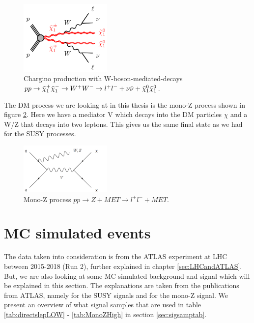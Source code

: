 \begin{figure}[H]
    \centering
    \includegraphics[width = 0.4\textwidth]{Figures/FeynmanDiagrams/WWFeynman.png}
    \caption{Chargino production with W-boson-mediated-decays $pp \rightarrow \tilde{\chi}_1^+ \tilde{\chi}_1^- \rightarrow W^+ W^- \rightarrow l^+l^- + \nu \Bar{\nu} + \tilde{\chi}_1^0 \tilde{\chi}_1^0$.}
    \label{fig:WWFeynman}
\end{figure}

The DM process we are looking at in this thesis is the mono-Z process shown in figure \ref{fig:monoZFeynman2}. Here we have a mediator V which decays into the DM particles $\chi$ and a W/Z that decays into two leptons. This gives us the same final state as we had for the SUSY processes.  

\begin{figure}[H]
    \centering
    \includegraphics[width = 0.4\textwidth]{Figures/FeynmanDiagrams/monoZFeynman2.png}
    \caption{Mono-Z process $pp \rightarrow Z + MET \rightarrow l^+ l^- + MET$.}
    \label{fig:monoZFeynman2}
\end{figure}


\section{MC simulated events}

The data taken into consideration is from the ATLAS experiment at LHC between 2015-2018 (Run 2), further explained in chapter \ref{sec:LHCandATLAS}. But, we are also looking at some MC simulated background and signal which will be explained in this section. The explanations are taken from the publications from ATLAS, namely \cite{sleptonexclusion} for the SUSY signals and \cite{monoZexclusion} for the mono-Z signal. We present an overview of what signal samples that are used in table \ref{tab:directslepLOW} - \ref{tab:MonoZHigh} in section \ref{sec:sigsamptab}. 

